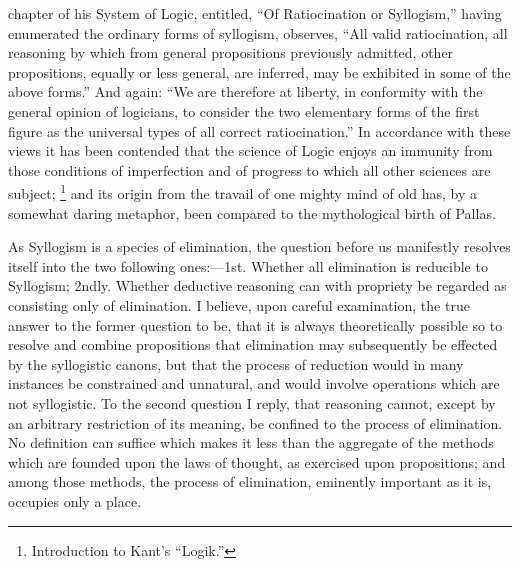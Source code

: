 \documentclass[oneside]{book}
\begin{document}
chapter of his System of Logic, entitled, ``Of Ratiocination or
Syllogism,'' having enumerated the ordinary forms of syllogism,
observes, ``All valid ratiocination, all reasoning by which from
general propositions previously admitted, other propositions,
equally or less general, are inferred, may be exhibited in some of
the above forms.'' And again: ``We are therefore at liberty,
in conformity with the general opinion of logicians, to consider
the two elementary forms of the first figure as the universal types
of all correct ratiocination.'' In accordance with these views it
has been contended that the science of Logic enjoys an immunity
from those conditions of imperfection and of progress to which
all other sciences are subject;%
\footnote{Introduction to Kant's ``Logik.''} and its origin from the travail of
one mighty mind of old has, by a somewhat daring metaphor,
been compared to the mythological birth of Pallas.

As Syllogism is a species of elimination, the question before
us manifestly resolves itself into the two following ones:---1st.
Whether all elimination is reducible to Syllogism; 2ndly.
Whether deductive reasoning can with propriety be regarded as consisting
only of elimination. I believe, upon careful examination,
the true answer to the former question to be, that it is always
theoretically possible so to resolve and combine propositions that
elimination may subsequently be effected by the syllogistic canons,
but that the process of reduction would in many instances
be constrained and unnatural, and would involve operations
which are not syllogistic. To the second question I reply, that
reasoning cannot, except by an arbitrary restriction of its meaning, be confined to the process of elimination. No definition can
suffice which makes it less than the aggregate of the methods
which are founded upon the laws of thought, as exercised upon
propositions; and among those methods, the process of elimination, eminently important as it is, occupies only a place.
\end{document}

